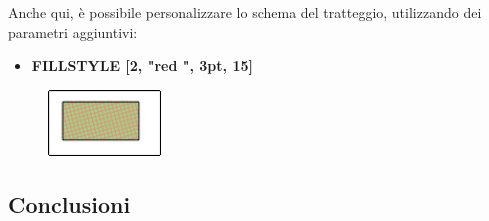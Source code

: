 \vskip 1cm

Anche qui, è possibile personalizzare lo schema del tratteggio, utilizzando dei parametri aggiuntivi:

\vskip 1cm

\begin{scriptsize}
\begin{minipage}{0.50\textwidth}
\begin{itemize}[itemsep=-3pt,parsep=2pt]
\item[] \textbf{FILLSTYLE [2,  "red ", 3pt, 15\degree]}           
\end{itemize}
\end{minipage}
\end{scriptsize}
\begin{minipage}{0.3\textwidth}
\begin{figure}[H]
   \includegraphics[width=3.0cm,trim=4 4 8 4,clip]{./images/disegnare/disegnare-41.png}
   \label{dis-42}
\end{figure}
\end{minipage} \hfill

\vskip 1cm

\subsection{Conclusioni}


